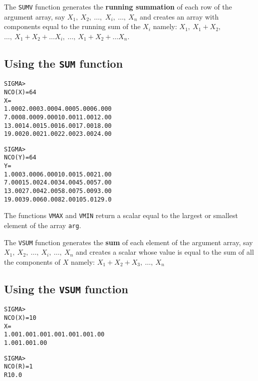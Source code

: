  
The \texttt{SUMV} function generates the {\bf running summation}
of each row of the argument
array, say 
\(X_1,\:X_2,\:\ldots,\)
\(X_i,\:\ldots,\:X_n\)
and creates an array with components equal to the running sum of the
\( X_i \) namely: 
\( X_1,\: X_1 + X_2 ,\)
\(\ldots, \: X_1 + X_2 + \ldots X_i, \:
                             \ldots, \: X_1 + X_2 + \ldots X_n \).

\subsection*{Using the \texttt{SUM} function}
\begin{alltt}
  SIGMA > 
  NCO(X       )=    6    4
  X       =
    1.000      2.000      3.000      4.000      5.000      6.000
    7.000      8.000      9.000      10.00      11.00      12.00
    13.00      14.00      15.00      16.00      17.00      18.00
    19.00      20.00      21.00      22.00      23.00      24.00
 
  SIGMA > 
  NCO(Y       )=    6    4
  Y       =
    1.000      3.000      6.000      10.00      15.00      21.00
    7.000      15.00      24.00      34.00      45.00      57.00
    13.00      27.00      42.00      58.00      75.00      93.00
    19.00      39.00      60.00      82.00      105.0      129.0
\end{alltt}
 
 
The functions \texttt{VMAX} and \texttt{VMIN}
return a scalar equal to the largest or smallest element of the array \texttt{arg}.

 
The \texttt{VSUM} function generates the {\bf  sum}
of each element of the argument
array, say 
\( X_1,\:X_2,\:\ldots,\:X_i,\:\ldots,\:X_n \)
and creates a scalar whose value is equal to 
the sum of all the components of \( X \) namely:
\( X_1 + X_2 + X_3,\:\ldots,\:X_n \)

\subsection*{Using the \texttt{VSUM} function}
\begin{alltt}
 SIGMA >
 NCO(X       )=   10
 X       =
   1.00      1.00      1.00      1.00      1.00      1.00      1.00
   1.00      1.00      1.00
 
 SIGMA >
 NCO(R       )=    1
 R         10.0
\end{alltt}

